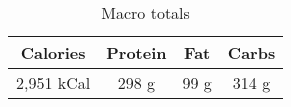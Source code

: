 \begin{multicols}{2}
\begin{enumerate}
 
\end{enumerate}
\begin{table}[H]
  \begin{center}
    \caption{Macro totals}
    \label{tab:table1}
    \begin{tabular}{c|c|c|c} %
      \textbf{Calories} & \textbf{Protein} & \textbf{Fat} & \textbf{Carbs}\\
      \hline
      2,951 kCal & 298 g & 99 g & 314 g\\
    \end{tabular}
  \end{center}
\end{table}
\end{multicols}



